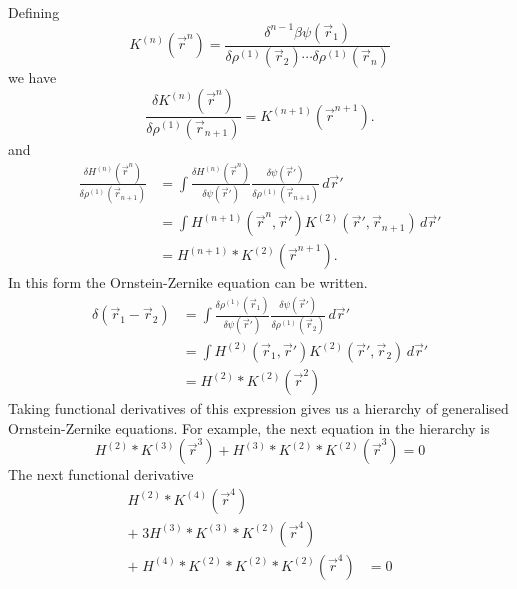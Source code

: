 Defining
\begin{equation*}
  K^{(n)}(\vec{r}^n)
  =
  \frac{
    \delta^{n-1} \beta\psi(\vec{r}_1)
  }{
    \delta \rho^{(1)}(\vec{r}_2) \cdots \delta \rho^{(1)}(\vec{r}_n)
  }
\end{equation*}
we have
\begin{equation*}
  \frac{
    \delta K^{(n)}(\vec{r}^n)
  }{
    \delta \rho^{(1)}(\vec{r}_{n+1})
  }
  =
  K^{(n+1)}(\vec{r}^{n+1}).
\end{equation*}
and
\begin{equation*}
  \begin{split}
    \frac{\delta H^{(n)}(\vec{r}^n)}{\delta \rho^{(1)}(\vec{r}_{n+1})}
    &=
    \int
    \frac{\delta H^{(n)}(\vec{r}^n)}{\delta \psi(\vec{r}')}
    \frac{\delta \psi(\vec{r}')}{\delta \rho^{(1)}(\vec{r}_{n+1})}
    \, d\vec{r}' \\
    &=
    \int
    H^{(n+1)}(\vec{r}^n, \vec{r}')
    K^{(2)}(\vec{r}', \vec{r}_{n+1})
    \, d\vec{r}' \\
    &=
    H^{(n+1)} * K^{(2)}(\vec{r}^{n+1}).
  \end{split}
\end{equation*}
In this form the Ornstein-Zernike equation can be written.
\begin{equation*}
  \begin{split}
    \delta(\vec{r}_1 - \vec{r}_2)
    &=
    \int
    \frac{\delta \rho^{(1)}(\vec{r}_1)}{\delta \psi(\vec{r}')}
    \frac{\delta \psi(\vec{r}')}{\delta \rho^{(1)}(\vec{r}_2)}
    \, d\vec{r}' \\
    &=
    \int
    H^{(2)}(\vec{r}_1, \vec{r}') K^{(2)}(\vec{r}', \vec{r}_2)
    \, d\vec{r}' \\
    &=
    H^{(2)} * K^{(2)} (\vec{r}^2)
  \end{split}
\end{equation*}
Taking functional derivatives of this expression gives us a hierarchy of generalised Ornstein-Zernike equations.
For example, the next equation in the hierarchy is
\begin{equation*}
  H^{(2)} * K^{(3)} (\vec{r}^3) +
  H^{(3)} * K^{(2)} * K^{(2)} (\vec{r}^3)
  = 0
\end{equation*}
The next functional derivative
\begin{equation}
  \begin{split}
  H^{(2)} * K^{(4)} (\vec{r}^4) & \\
  + \; 3 H^{(3)} * K^{(3)} * K^{(2)} (\vec{r}^4) & \\
  + \; H^{(4)} * K^{(2)} * K^{(2)} * K^{(2)} (\vec{r}^4)
  &= 0
  \end{split}
\end{equation}
